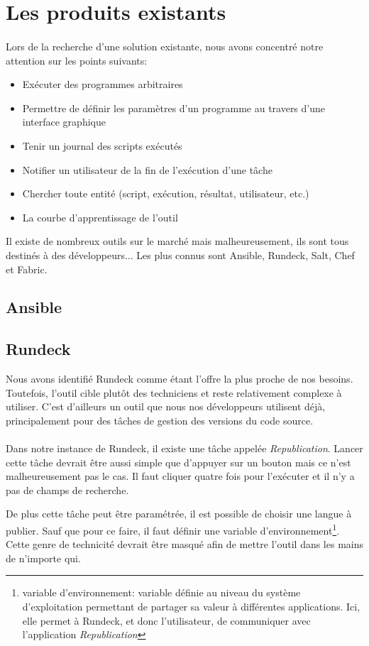 \section{Les produits existants}
\label{sec:existing-products}

\paragraph{}
Lors de la recherche d'une solution existante, nous avons concentré notre attention sur les points suivants:
\begin{itemize}
    \item Exécuter des programmes arbitraires
    \item Permettre de définir les paramètres d'un programme au travers d'une interface graphique
    \item Tenir un journal des scripts exécutés
    \item Notifier un utilisateur de la fin de l'exécution d'une tâche
    \item Chercher toute entité (script, exécution, résultat, utilisateur, etc.)
    \item La courbe d'apprentissage de l'outil
\end{itemize}
Il existe de nombreux outils sur le marché mais malheureusement, ils sont tous destinés à des développeurs...
Les plus connus sont Ansible, Rundeck, Salt, Chef et Fabric.

\subsection{Ansible}

\subsection{Rundeck}
Nous avons identifié Rundeck comme étant l'offre la plus proche de nos besoins.
Toutefois, l'outil cible plutôt des techniciens et reste relativement complexe à utiliser.
C'est d'ailleurs un outil que nous nos développeurs utilisent déjà, principalement pour des tâches de gestion des versions du code source.

\paragraph{}
Dans notre instance de Rundeck, il existe une tâche appelée \textit{Republication}.
Lancer cette tâche devrait être aussi simple que d'appuyer sur un bouton mais ce n'est malheureusement pas le cas.
Il faut cliquer quatre fois pour l'exécuter et il n'y a pas de champs de recherche.

De plus cette tâche peut être paramétrée, il est possible de choisir une langue à publier.
Sauf que pour ce faire, il faut définir une variable d'environnement\footnote{variable d'environnement: variable définie au niveau du système d'exploitation permettant de partager sa valeur à différentes applications. Ici, elle permet à Rundeck, et donc l'utilisateur, de communiquer avec l'application \textit{Republication}}.
Cette genre de technicité devrait être masqué afin de mettre l'outil dans les mains de n'importe qui.


